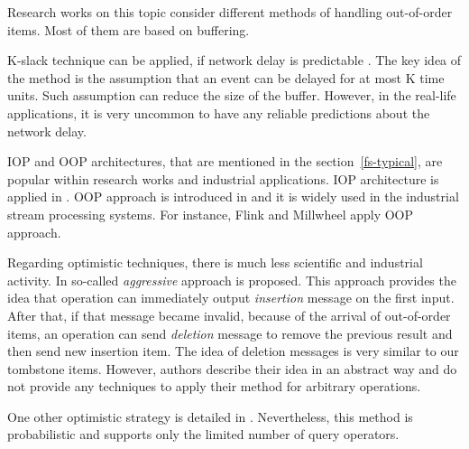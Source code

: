 
\label {fs-related}

Research works on this topic consider different methods of handling out-of-order items. Most of them are based on buffering.

K-slack technique can be applied, if network delay is predictable \cite{Babu:2004:EKC:1016028.1016032, Li:2007:ESP:1270388.1270975}. The key idea of the method is the assumption that an event can be delayed for at most K time units. Such assumption can reduce the size of the buffer. However, in the real-life applications, it is very uncommon to have any reliable predictions about the network delay.

IOP and OOP architectures, that are mentioned in the section~\ref{fs-typical}, are popular within research works and industrial applications. IOP architecture is applied in \cite{Cranor:2003:GSD:872757.872838, Abadi:2003:ANM:950481.950485, Arasu:2006:CCQ:1146461.1146463, Ding:2004:EWJ:1031171.1031189, Hammad:2003:SSW:1315451.1315478, Hammad:2005:OIE:1116877.1116897}. OOP approach is introduced in \cite{Li:2008:OPN:1453856.1453890} and it is widely used in the industrial stream processing systems. For instance, Flink \cite{carbone2015apache} and Millwheel \cite{Akidau:2013:MFS:2536222.2536229} apply OOP approach.

Regarding optimistic techniques, there is much less scientific and industrial activity. In \cite{Wei:2009:SSO:1559845.1559973} so-called {\it aggressive} approach is proposed. This approach provides the idea that operation can immediately output {\it insertion} message on the first input. After that, if that message became invalid, because of the arrival of out-of-order items, an operation can send {\it deletion} message to remove the previous result and then send new insertion item. The idea of deletion messages is very similar to our tombstone items. However, authors describe their idea in an abstract way and do not provide any techniques to apply their method for arbitrary operations.

One other optimistic strategy is detailed in \cite{Li2011}. Nevertheless, this method is probabilistic and supports only the limited number of query operators.
